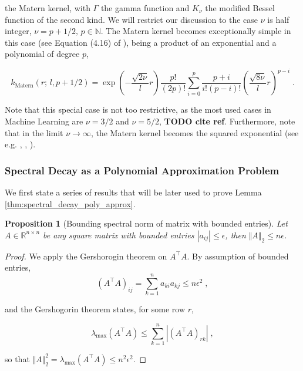 \documentclass{article}
\newcommand{\R}{\mathbb R}
\newcommand{\norm}[1]{\Vert #1 \Vert}
\newtheorem{proposition}[theorem]{Proposition}
\begin{document}
the Matern kernel, with $\Gamma$ the gamma function and $K_\nu$ the modified Bessel function of the second kind. We will restrict our discussion to the case $\nu$ is half integer, $\nu = p+1/2, \, p \in \mathbb N$. The Matern kernel becomes exceptionally simple in this case (see Equation (4.16) of \cite{rasmussen_gaussian_2005}), being a product of an exponential and a polynomial of degree $p$,

\begin{equation} \label{eq:matern_half_integer}
    k_{\text{Matern}}(r ; \, l, p + 1/2) = \exp\left( - \frac{\sqrt{2\nu}}{l} r \right) \frac{p!}{(2p)!} \sum_{i=0}^p \frac{p+i}{i!(p-i)!} \left( \frac{\sqrt{8\nu}}{l} r \right)^{p-i} \; .
\end{equation}

Note that this special case is not too restrictive, as the most used cases in Machine Learning are $\nu = 3/2$ and $\nu = 5/2$, \textbf{TODO cite ref}. Furthermore, note that in the limit $\nu \to \infty$, the Matern kernel becomes the squared exponential (see e.g. \cite{borovitskiy_matern_nodate}, \cite{genton_classes_2002}, \cite{rasmussen_gaussian_2005}). 


\subsubsection{Spectral Decay as a Polynomial Approximation Problem}

We first state a series of results that will be later used to prove Lemma \ref{thm:spectral_decay_poly_approx}.

\begin{proposition}[Bounding spectral norm of matrix with bounded entries] \label{thm:gershogorin}
Let $A \in \R^{n \times n}$ be any square matrix with bounded entries $|a_{ij}| \le \epsilon$, then $\norm{A}_2 \le n\epsilon$.
\end{proposition}
\begin{proof}
We apply the Gershorogin theorem on $A^\top A$. By assumption of bounded entries, 
\begin{equation*}
    (A^\top A)_{ij} = \textstyle\sum_{k=1}^n a_{ki} a_{kj} \le n\epsilon^2 \; ,
\end{equation*}

and the Gershogorin theorem states, for some row $r$,

\begin{equation*}
    \lambda_{\max}(A^\top A) \le \textstyle\sum_{k=1}^n |(A^\top A)_{rk}| \; ,
\end{equation*}

so that $\norm{A}_2^2 = \lambda_{\max}(A^\top A) \le n^2\epsilon^2$.
\end{proof}
\end{document}
